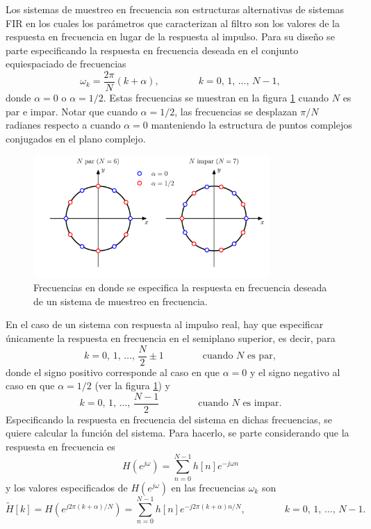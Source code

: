\documentclass[a4paper]{report}
\begin{document}
Los sistemas de muestreo en frecuencia son estructuras alternativas de sistemas FIR en los cuales los parámetros que caracterizan al filtro son los valores de la respuesta en frecuencia en lugar de la respuesta al impulso. Para su diseño se parte especificando la respuesta en frecuencia deseada en el conjunto equiespaciado de frecuencias
\[
 \omega_k=\frac{2\pi}{N}(k+\alpha),
 \qquad\qquad k=0,\,1,\,\dots,\,N-1,
\]
donde \(\alpha=0\) o \(\alpha=1/2\). Estas frecuencias se muestran en la figura \ref{fig:frequency_sampling_zeros} cuando \(N\) es par e impar. Notar que cuando \(\alpha=1/2\), las frecuencias se desplazan \(\pi/N\) radianes respecto a cuando \(\alpha=0\) manteniendo la estructura de puntos complejos conjugados en el plano complejo.
\begin{figure}[!htb]
 \begin{center}
 \includegraphics[width=0.8\textwidth]{figuras/frequency_sampling_zeros.pdf}
 \caption{\label{fig:frequency_sampling_zeros} Frecuencias en donde se especifica la respuesta en frecuencia deseada de un sistema de muestreo en frecuencia.}
 \end{center}
\end{figure}
En el caso de un sistema con respuesta al impulso real, hay que especificar únicamente la respuesta en frecuencia en el semiplano superior, es decir, para
\[
 k=0,\,1,\,\dots,\,\frac{N}{2}\pm1
 \qquad\qquad\textrm{cuando }N\textrm{ es par},
\]
donde el signo positivo corresponde al caso en que \(\alpha=0\) y el signo negativo al caso en que \(\alpha=1/2\) (ver la figura \ref{fig:frequency_sampling_zeros}) y
\[
 k=0,\,1,\,\dots,\,\frac{N-1}{2}
 \qquad\qquad\textrm{cuando }N\textrm{ es impar}.
\]
Especificando la respuesta en frecuencia del sistema en dichas frecuencias, se quiere calcular la función del sistema. Para hacerlo, se parte considerando que la respuesta en frecuencia es
\[
 H(e^{j\omega})=\sum_{n=0}^{N-1}h[n]e^{-j\omega n}
\]
y los valores especificados de \(H(e^{j\omega})\) en las frecuencias \(\omega_k\) son
\begin{equation}\label{eq:structures_freq_sampling_dft}
 \tilde{H}[k]=H(e^{j2\pi(k+\alpha)/N})=\sum_{n=0}^{N-1}h[n]e^{-j2\pi(k+\alpha)n/N},
 \qquad\qquad 
 k=0,\,1,\,\dots,\,N-1. 
\end{equation}
\end{document}
